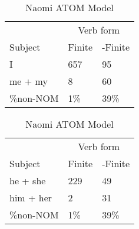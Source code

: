 \begin{table}[]
\caption{Naomi ATOM Model}
\begin{minipage}{0.5\textwidth}
    \centering
    \begin{tabular}{@{}lll@{}}
        \toprule
         & \multicolumn{2}{c}{Verb form}\\
         \cline{2-3}
        Subject & Finite & -Finite \\
        \midrule
        I & 657 & 95 \\
        me + my & 8 & 60 \\
        \hline
        \%non-NOM & 1\% & 39\% \\
        \bottomrule
    \end{tabular}
\end{minipage}
\begin{minipage}{0.5\textwidth}
    \centering
    \begin{tabular}{@{}lll@{}}
        \toprule
         & \multicolumn{2}{c}{Verb form}\\
         \cline{2-3}
        Subject & Finite & -Finite \\
        \midrule
        he + she & 229 & 49 \\
        him + her & 2 & 31 \\
        \hline
        \%non-NOM & 1\% & 39\% \\
        \bottomrule
    \end{tabular}
    \end{minipage}


\end{table}
